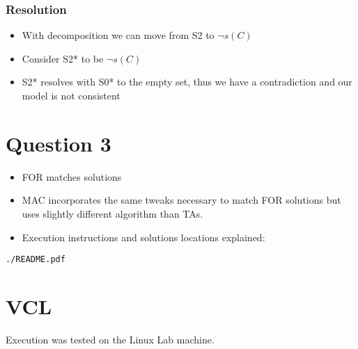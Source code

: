 \documentclass[11pt]{article}
\begin{document}
\subsubsection{Resolution}
\label{sec:orgd138058}
\begin{itemize}
\item With decomposition we can move from S2 to \(\lnot s(C)\)
\item Consider S2* to be \(\lnot s(C)\)
\item S2* resolves with S0* to the empty set, thus we have a contradiction and our model is not consistent
\end{itemize}
\section{Question 3}
\label{sec:org127d547}
\begin{itemize}
\item FOR matches solutions
\item MAC incorporates the same tweaks necessary to match FOR solutions but uses slightly different algorithm than TAs.
\item Execution instructions and solutions locations explained:
\end{itemize}
\lstset{language=shell,label= ,caption= ,captionpos=b,numbers=none}
\begin{lstlisting}
./README.pdf
\end{lstlisting}
\section{VCL}
\label{sec:org7b08083}
Execution was tested on the Linux Lab machine.
\end{document}

